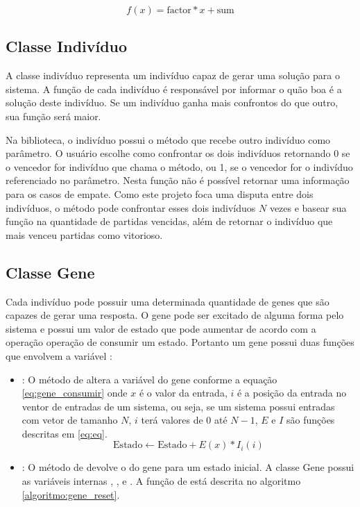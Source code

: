 \begin{equation}
    \label{eq:eq}
    f(x)=\mathrm{factor}*x + \mathrm{sum}
\end{equation}

\subsection{Classe Indivíduo}

A classe indivíduo representa um indivíduo capaz de gerar uma solução para o sistema. A função \fitness de cada indivíduo é responsável por informar o quão boa é a solução deste indivíduo. Se um indivíduo ganha mais confrontos do que outro, sua função \fitness será maior.

Na biblioteca, o indivíduo possui o método  que recebe outro indivíduo como parâmetro. O usuário escolhe como confrontar os dois indivíduos retornando 0 se o vencedor for indivíduo que chama o método, ou 1, se o vencedor for o indivíduo referenciado no parâmetro. Nesta função não é possível retornar uma informação para os casos de empate. Como este projeto foca uma disputa entre dois indivíduos, o método  pode confrontar esses dois indivíduos $N$ vezes e basear sua função \fitness na quantidade de partidas vencidas, além de retornar o indivíduo que mais venceu partidas como vitorioso.

\subsection{Classe Gene}

Cada indivíduo pode possuir uma determinada quantidade de genes que são capazes de gerar uma resposta. O gene pode ser excitado de alguma forma pelo sistema e possui um valor de estado que pode aumentar de acordo com a operação operação de consumir um estado. Portanto um gene possui duas funções que envolvem a variável :

\begin{itemize}
    \item {}: O método de  altera a variável  do gene conforme a equação \ref{eq:gene_consumir} onde $x$ é o valor da entrada, $i$ é a posição da entrada no ventor de entradas de um sistema, ou seja, se um sistema possui entradas com vetor de tamanho $N$, $i$ terá valores de 0 até $N-1$, $E$ e $I$ são funções descritas em \ref{eq:eq}.
    \begin{equation}
        \label{eq:gene_consumir}
        \mathrm{Estado} \leftarrow \mathrm{Estado} +  E(x) * I_i(i)
    \end{equation}
    \item {}: O método de  devolve o  do gene para um estado inicial. A classe Gene possui as variáveis internas , ,  e . A função de  está descrita no algoritmo \ref{algoritmo:gene_reset}.
\end{itemize}

